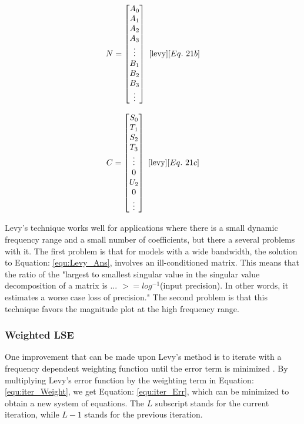 \begin{multicols}{2}
    \begin{equation}
        \label{equ:Levy_N}
        N = 
        \begin{bmatrix}
            A_0 \\
            A_1 \\
            A_2 \\
            A_3 \\
            \vdots \\
            B_1 \\
            B_2 \\
            B_3 \\
            \vdots
        \end{bmatrix}
        ~\cite{levy}[Eq.~21b]
    \end{equation}

    \begin{equation}
        \label{equ:Levy_C}
        C = 
        \begin{bmatrix}
            S_0 \\
            T_1 \\
            S_2 \\
            T_3 \\
            \vdots \\
            0   \\
            U_2 \\
            0   \\
            \vdots
        \end{bmatrix}
        ~\cite{levy}[Eq.~21c]
    \end{equation}
\end{multicols}

Levy's technique works well for applications where there is a small dynamic frequency range and a small number of coefficients, but there a several problems with it.
The first problem is that for models with a wide bandwidth, the solution to Equation: \eqref{equ:Levy_Ans}, involves an ill-conditioned matrix. This means that the ratio of the "largest to smallest singular value in the singular value decomposition of a matrix is ... $>= log^{-1}$(input precision). In other words, it estimates a worse case loss of precision."
The second problem is that this technique favors the magnitude plot at the high frequency range. 



\subsubsection{Weighted LSE}
\label{sec:weightedLSE}
One improvement that can be made upon Levy's method is to iterate with a frequency dependent weighting function until the error term is minimized \cite{levy_iter}. By multiplying Levy's error function by the weighting term in Equation: \eqref{equ:iter_Weight}, we get Equation: \eqref{equ:iter_Err}, which can be minimized to obtain a new system of equations.
The $L$ subscript stands for the current iteration, while $L-1$ stands for the previous iteration.

